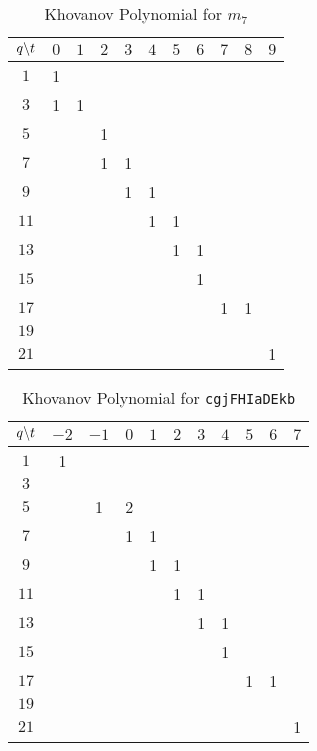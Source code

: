 \documentclass{article}
\theoremstyle{plain}
\begin{document}
        \begin{table}[H]
            \centering
            \begin{tabular}{| c | c | c | c | c | c | c | c | c | c | c |}
                \hline
                $q\symbol{92}t$&$0$&$1$&$2$&$3$&$4$&$5$&$6$&$7$&$8$&$9$\\
                \hline
                $1$&1&&&&&&&&&\\
                \hline
                $3$&1&1&&&&&&&&\\
                \hline
                $5$&&&1&&&&&&&\\
                \hline
                $7$&&&1&1&&&&&&\\
                \hline
                $9$&&&&1&1&&&&&\\
                \hline
                $11$&&&&&1&1&&&&\\
                \hline
                $13$&&&&&&1&1&&&\\
                \hline
                $15$&&&&&&&1&&&\\
                \hline
                $17$&&&&&&&&1&1&\\
                \hline
                $19$&&&&&&&&&&\\
                \hline
                $21$&&&&&&&&&&1\\
                \hline
            \end{tabular}
            \caption{Khovanov Polynomial for $m_{7}$}
            \label{table:m_7_kho}
        \end{table}
        \begin{table}[H]
            \centering
            \begin{tabular}{| c | c | c | c | c | c | c | c | c | c | c |}
                \hline
                $q\symbol{92}t$&$-2$&$-1$&$0$&$1$&$2$&$3$&$4$&$5$&$6$&$7$\\
                \hline
                $1$&1&&&&&&&&&\\
                \hline
                $3$&&&&&&&&&&\\
                \hline
                $5$&&1&2&&&&&&&\\
                \hline
                $7$&&&1&1&&&&&&\\
                \hline
                $9$&&&&1&1&&&&&\\
                \hline
                $11$&&&&&1&1&&&&\\
                \hline
                $13$&&&&&&1&1&&&\\
                \hline
                $15$&&&&&&&1&&&\\
                \hline
                $17$&&&&&&&&1&1&\\
                \hline
                $19$&&&&&&&&&&\\
                \hline
                $21$&&&&&&&&&&1\\
                \hline
            \end{tabular}
            \caption{Khovanov Polynomial for \texttt{cgjFHIaDEkb}}
            \label{table:cgjFHIaDEkb_kho}
        \end{table}
\end{document}
